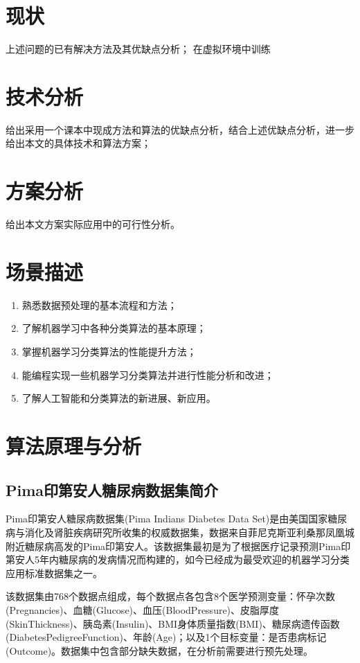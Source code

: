 \documentclass[a4paper]{ctexart}
\begin{document}
\section{现状}
上述问题的已有解决方法及其优缺点分析；
在虚拟环境中训练
\section{技术分析}
给出采用一个课本中现成方法和算法的优缺点分析，结合上述优缺点分析，进一步给出本文的具体技术和算法方案；
\section{方案分析}
给出本文方案实际应用中的可行性分析。

\section{场景描述}
\begin{enumerate}[label=\arabic*、]
	\item 熟悉数据预处理的基本流程和方法；
	\item 了解机器学习中各种分类算法的基本原理；
	\item 掌握机器学习分类算法的性能提升方法；
	\item 能编程实现一些机器学习分类算法并进行性能分析和改进；
	\item 了解人工智能和分类算法的新进展、新应用。
\end{enumerate}

\section{算法原理与分析}
\subsection{Pima印第安人糖尿病数据集简介}
Pima印第安人糖尿病数据集(Pima Indians Diabetes Data Set)是由美国国家糖尿病与消化及肾脏疾病研究所收集的权威数据集，数据来自菲尼克斯亚利桑那凤凰城附近糖尿病高发的Pima印第安人\cite{RN162}。该数据集最初是为了根据医疗记录预测Pima印第安人5年内糖尿病的发病情况而构建的，如今已经成为最受欢迎的机器学习分类应用标准数据集之一。

该数据集由768个数据点组成，每个数据点各包含8个医学预测变量：怀孕次数(Pregnancies)、血糖(Glucose)、血压(BloodPressure)、皮脂厚度(SkinThickness)、胰岛素(Insulin)、BMI身体质量指数(BMI)、糖尿病遗传函数(DiabetesPedigreeFunction)、年龄(Age)；以及1个目标变量：是否患病标记(Outcome)。数据集中包含部分缺失数据，在分析前需要进行预先处理。
\end{document}
